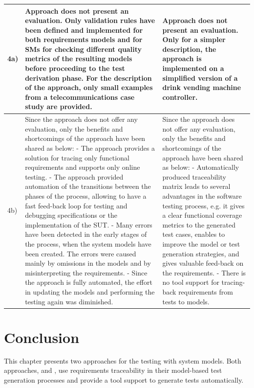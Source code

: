 \begin{landscape}
\begin{small}
\begin{longtable}{ p{0.5cm} | p{11cm} | p{11cm} }
\hline
4a) & Approach does not present an evaluation. Only validation rules have been defined and implemented for both requirements models and for SMs for checking different quality metrics of the resulting models before proceeding to the test derivation phase.
\newline For the description of the approach, only small examples from a telecommunications case study are provided. & Approach does not present an evaluation. Only for a simpler description, the approach is implemented on a simplified version of a drink vending machine controller.\\
\hline
4b) & Since the approach does not offer any evaluation, only the benefits and shortcomings of the approach have been shared as below:
\newline - The approach provides a solution for tracing only functional requirements and supports only online testing.
\newline - The approach provided automation of the transitions between the phases of the process, allowing to have a fast feed-back loop for testing and debugging specifications or the implementation of the SUT.
\newline - Many errors have been detected in the early stages of the process, when the system models have been created. The errors were caused mainly by omissions in the models and by misinterpreting the requirements.
\newline - Since the approach is fully automated, the effort in updating the models and performing the testing again was diminished.
 & Since the approach does not offer any evaluation, only the benefits and shortcomings of the approach have been shared as below:
 \newline - Automatically produced traceability matrix leads to several advantages in the software testing process, e.g. it gives a clear functional coverage metrics to the generated test cases, enables to improve the model or test generation strategies, and gives valuable feed-back on the requirements.
 \newline - There is no tool support for tracing-back requirements from tests to models.\\
\hline
\end{longtable}
\end{small}
\end{landscape} 
\restoregeometry


\newpage
\section{Conclusion}
\label{sec:Conc} 
This chapter presents two approaches for the testing with system models. Both approaches, \cite{Paper1} and \cite{Paper2}, use requirements traceability in their model-based test generation processes and provide a tool support to generate tests automatically. 

